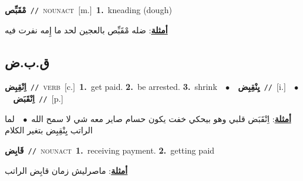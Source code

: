\documentclass[10pt,a4paper,twoside]{article} %
\begin{document}
\begin{multicols}{2}
{{{{{{{\setlength\topsep{0pt}\textbf{\foreignlanguage{arabic}{مْقَبِّص}}\ {\color{gray}\texttt{//}\color{black}}\ \textsc{noun\textunderscore act}\ [m.]\ \textbf{1.}~kneading (dough)\  \begin{flushright}\color{gray}\foreignlanguage{arabic}{\textbf{\underline{\foreignlanguage{arabic}{أمثلة}}}: ضله مْقَبِّص بالعجين لحد ما إِمه نفرت فيه}\end{flushright}\color{black}} \vspace{2mm}

\vspace{-3mm}
\subsection*{\color{blue}\foreignlanguage{arabic}{ق.ب.ض}\color{blue}{}} 

{\setlength\topsep{0pt}\textbf{\foreignlanguage{arabic}{اِنْقِبِض}}\ {\color{gray}\texttt{//}\color{black}}\ \textsc{verb}\ [c.]\ \textbf{1.}~get paid.  \textbf{2.}~be arrested.  \textbf{3.}~shrink\ \ $\bullet$\ \ \setlength\topsep{0pt}\textbf{\foreignlanguage{arabic}{يِنْقِبِض}}\ {\color{gray}\texttt{//}\color{black}}\ [i.]\ \ $\bullet$\ \ \setlength\topsep{0pt}\textbf{\foreignlanguage{arabic}{اِنْقَبَض}}\ {\color{gray}\texttt{//}\color{black}}\ [p.]\  \begin{flushright}\color{gray}\foreignlanguage{arabic}{\textbf{\underline{\foreignlanguage{arabic}{أمثلة}}}: اِنْقَبَض قلبي وهو بيحكي خفت يكون حسام صاير معه شي لا سمح الله\ $\bullet$\ \  لما الراتب يِنْقِبِض بتغير الكلام}\end{flushright}\color{black}} \vspace{2mm}

{\setlength\topsep{0pt}\textbf{\foreignlanguage{arabic}{قَابِض}}\ {\color{gray}\texttt{//}\color{black}}\ \textsc{noun\textunderscore act}\ \textbf{1.}~receiving payment.  \textbf{2.}~getting paid\  \begin{flushright}\color{gray}\foreignlanguage{arabic}{\textbf{\underline{\foreignlanguage{arabic}{أمثلة}}}: ماصرليش زمان قابِض الراتب}\end{flushright}\color{black}} \vspace{2mm}

}}}}}}
\end{multicols}
\end{document}
